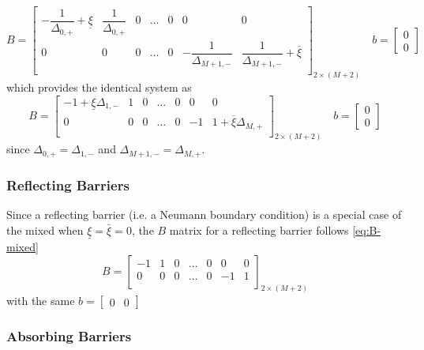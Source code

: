 \documentclass[11pt]{article}
\theoremstyle{definition}
\begin{document}
\begin{equation}\label{eq:mixed-barrier-matrix-original}
B = \begin{bmatrix}
-\dfrac{1}{\Delta_{0,+}} + \underline{\xi} & \dfrac{1}{\Delta_{0,+}} & 0 & \dots & 0 & 0 & 0 \\
0 & 0 & 0 & \dots & 0 & -\dfrac{1}{\Delta_{M+1,-}} & \dfrac{1}{\Delta_{M+1,-}} + \overline{\xi}\\
\end{bmatrix}_{2 \times (M+2)} \quad
b = \begin{bmatrix}
0 \\
0
\end{bmatrix}
\end{equation}
which provides the identical system as
\begin{equation}\label{eq:mixed-barrier-matrix}
B = \begin{bmatrix}
-1 +  \underline{\xi} \Delta_{1,-} & 1 & 0 & \dots & 0 & 0 & 0 \\
0 & 0 & 0 & \dots & 0 & -1 & 1 + \overline{\xi} \Delta_{M,+}\\
\end{bmatrix}_{2 \times (M+2)} \quad
b = \begin{bmatrix}
0 \\
0
\end{bmatrix}
\end{equation}
since $\Delta_{0,+} = \Delta_{1,-}$ and $\Delta_{M+1,-} = \Delta_{M,+}$.

\subsubsection{Reflecting Barriers}
Since a reflecting barrier (i.e. a Neumann boundary condition) is a special case of the mixed when  $\underline{\xi} = \bar{\xi} = 0$, the $B$ matrix for a reflecting barrier follows \cref{eq:B-mixed}
\begin{equation}
B = \begin{bmatrix}
-1& 1 & 0 & \dots & 0 & 0 & 0 \\
0 & 0 & 0 & \dots & 0 & -1 & 1\\
\end{bmatrix}_{2 \times (M+2)}
\end{equation}
with the same $b = \begin{bmatrix}	0&	0\end{bmatrix}$

\subsubsection{Absorbing Barriers}
\end{document}
